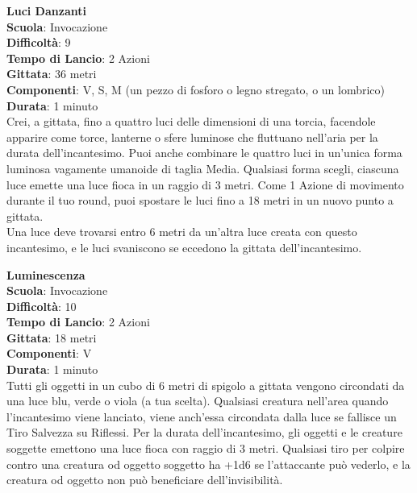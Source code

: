\begin{multicols}{2}
\medskip\textbf{Luci Danzanti}\\
\textbf{Scuola}: Invocazione\\
\textbf{Difficoltà}:  9\\
\textbf{Tempo di Lancio}: 2 Azioni\\
\textbf{Gittata}: 36 metri\\
\textbf{Componenti}: V, S, M (un pezzo di fosforo o legno stregato, o un lombrico)\\
\textbf{Durata}: 1 minuto\\
Crei, a gittata, fino a quattro luci delle dimensioni di una torcia, facendole apparire come torce, lanterne o sfere luminose che fluttuano nell'aria per la durata dell'incantesimo. Puoi anche combinare le quattro luci in un'unica forma luminosa vagamente umanoide di taglia Media. Qualsiasi  forma scegli, ciascuna luce emette una luce fioca in un raggio di 3 metri. Come 1 Azione di movimento durante il tuo round, puoi spostare le luci fino a 18 metri in un nuovo punto a gittata.\\
Una  luce deve trovarsi entro 6 metri da un'altra luce creata con questo incantesimo, e le luci svaniscono se eccedono la gittata dell'incantesimo. 

\medskip\textbf{Luminescenza}\\
\textbf{Scuola}: Invocazione\\
\textbf{Difficoltà}:  10\\
\textbf{Tempo di Lancio}: 2 Azioni\\
\textbf{Gittata}: 18 metri\\
\textbf{Componenti}: V\\
\textbf{Durata}: 1 minuto \\
Tutti gli oggetti in un cubo di 6 metri di spigolo a gittata vengono circondati da una luce blu,  verde o viola (a tua scelta). Qualsiasi creatura nell'area quando l'incantesimo viene lanciato, viene anch’essa circondata dalla luce se fallisce un Tiro Salvezza su Riflessi. Per la durata dell'incantesimo, gli oggetti e le creature soggette emettono una luce fioca con raggio di 3 metri. Qualsiasi tiro per colpire contro una creatura od oggetto soggetto ha +1d6 se l’attaccante può vederlo, e la creatura od oggetto non può beneficiare dell'invisibilità.


\end{multicols}
